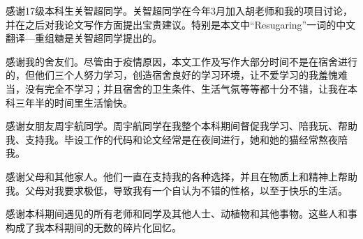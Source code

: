 \documentclass[UTF8,openany,AutoFakeBold,AutoFakeSlant,cs4size]{ctexbook}
\begin{document}
感谢17级本科生关智超同学。关智超同学在今年3月加入胡老师和我的项目讨论，并在之后对我论文写作方面提出宝贵建议。特别是本文中“Resugaring”一词的中文翻译---重组糖是关智超同学提出的。

感谢我的舍友们。尽管由于疫情原因，本文工作及写作大部分时间不是在宿舍进行的，但他们三个人努力学习，创造宿舍良好的学习环境，让不爱学习的我羞愧难当，没有完全不学习；并且宿舍的卫生条件、生活气氛等等都十分不错，让我在本科三年半的时间里生活愉快。

感谢女朋友周宇航同学。周宇航同学在我整个本科期间督促我学习、陪我玩、帮助我、支持我。毕设工作的代码和论文经常是在夜间进行，她和她的猫经常熬夜陪我。

感谢父母和其他家人。他们一直在支持我的各种选择，并且在物质上和精神上帮助我。父母对我要求极低，导致我有一个自认为不错的性格，以至于快乐的生活。

感谢本科期间遇见的所有老师和同学及其他人士、动植物和其他事物。这些人和事构成了我本科期间的无数的碎片化回忆。


{
	\fancyhf{}
	\fancyfoot[CO,CE]{~\thepage~}
	\renewcommand{\headrulewidth}{0.7pt}
	\renewcommand{\footrulewidth}{0pt}
}
\fancyhf{}
\fancyfoot[CO,CE]{~\thepage~}
\renewcommand{\headrulewidth}{0.7pt}
\renewcommand{\footrulewidth}{0pt}
\end{document}
